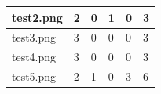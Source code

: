 \documentclass[a4paper,12pt]{article}
\begin{document}
\begin{table}[H]
\begin{tabular}{llllll}
		\multicolumn{1}{|l|}{test2.png}                                                                        & \multicolumn{1}{l|}{2}                                                                 & \multicolumn{1}{l|}{0}                                                                  & \multicolumn{1}{l|}{1}                                                                  & \multicolumn{1}{l|}{0}                                                                                      & \multicolumn{1}{l|}{3}                                                                                             \\ \hline
		\multicolumn{1}{|l|}{test3.png}                                                                        & \multicolumn{1}{l|}{3}                                                                 & \multicolumn{1}{l|}{0}                                                                  & \multicolumn{1}{l|}{0}                                                                  & \multicolumn{1}{l|}{0}                                                                                      & \multicolumn{1}{l|}{3}                                                                                             \\ \hline
		\multicolumn{1}{|l|}{test4.png}                                                                        & \multicolumn{1}{l|}{3}                                                                 & \multicolumn{1}{l|}{0}                                                                  & \multicolumn{1}{l|}{0}                                                                  & \multicolumn{1}{l|}{0}                                                                                      & \multicolumn{1}{l|}{3}                                                                                             \\ \hline
		\multicolumn{1}{|l|}{test5.png}                                                                        & \multicolumn{1}{l|}{2}                                                                 & \multicolumn{1}{l|}{1}                                                                  & \multicolumn{1}{l|}{0}                                                                  & \multicolumn{1}{l|}{3}                                                                                      & \multicolumn{1}{l|}{6}                                                                                             \\ \hline

\end{tabular}
\end{table}
\end{document}
